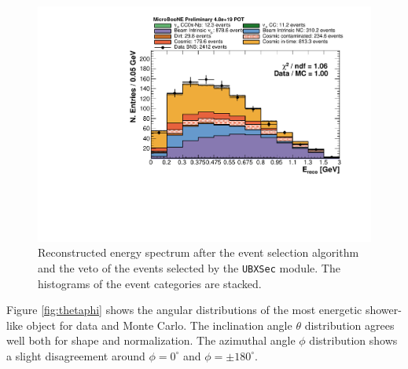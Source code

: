 \begin{figure}[htbp]
\centering
  \includegraphics[width=0.65\linewidth]{figures/h_fixed_energy.pdf}
  \caption{Reconstructed energy spectrum after the event selection algorithm and the veto of the events selected by the \texttt{UBXSec} module. The histograms of the event categories are stacked.}
  \label{fig:spectrum}
\end{figure}

Figure \ref{fig:thetaphi} shows the angular distributions of the most energetic shower-like object for data and Monte Carlo. The inclination angle $\theta$ distribution agrees well both for shape and normalization. The azimuthal angle $\phi$ distribution shows a slight disagreement around $\phi = 0^{\circ}$ and $\phi = \pm180^{\circ}$.

